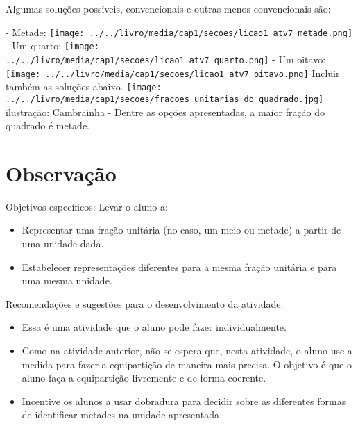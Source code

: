 \documentclass{book}
\begin{document}
  Algumas soluções possíveis, convencionais e outras menos convencionais são:  
  
        - Metade:   \mbox{} \newline        \texttt{[image: ../../livro/media/cap1/secoes/licao1\_atv7\_metade.png]}  
        - Um quarto:  \mbox{} \newline        \texttt{[image: ../../livro/media/cap1/secoes/licao1\_atv7\_quarto.png]}  
        - Um oitavo:   \mbox{} \newline        \texttt{[image: ../../livro/media/cap1/secoes/licao1\_atv7\_oitavo.png]}  \mbox{} \newline    Incluir também as soluções abaixo.  \mbox{} \newline        \texttt{[image: ../../livro/media/cap1/secoes/fracoes\_unitarias\_do\_quadrado.jpg]}  \mbox{} \newline    ilustração: Cambrainha  
        - Dentre as opções apresentadas, a maior fração do quadrado é metade.  
  
  
  



\section{Observação}  
  
  Objetivos específicos: Levar o aluno a:  
\begin{itemize} %
    \item       Representar uma fração unitária (no caso, um meio ou metade) a partir de uma unidade dada.  
    \item       Estabelecer representações diferentes para a mesma fração unitária e para uma mesma unidade.
\end{itemize} %
  
  
  Recomendações e sugestões para o desenvolvimento da atividade:  
\begin{itemize} %
    \item       Essa é uma atividade que o aluno pode fazer individualmente. 
    \item       Como na atividade anterior, não se espera que, nesta atividade, o aluno use a medida para fazer a equipartição de maneira mais precisa. O objetivo é que o aluno faça a equipartição livremente e de forma coerente. 
    \item       Incentive os alunos a usar dobradura para decidir sobre as diferentes formas de identificar metades na unidade apresentada.
\end{itemize} %
  
\end{document}
